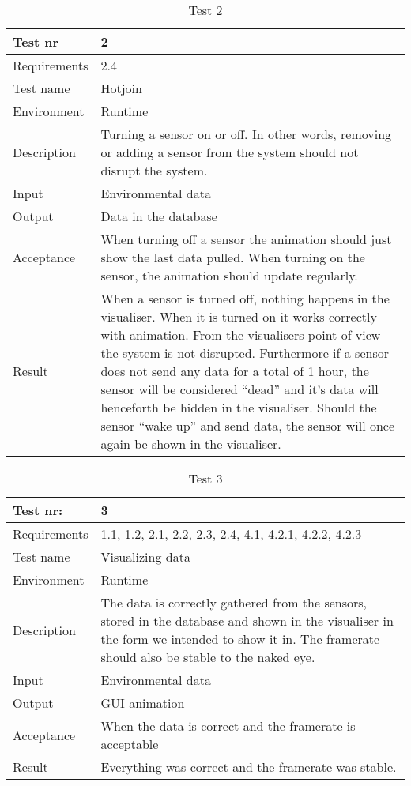 \documentclass[../document]{subfiles}
\begin{document}
\begin{table}[H]
\caption{Test 2}
\centering
\begin{tabularx}{\textwidth}{|l|X|}
	\hline
	Test nr
	&2
	\\ \hline Requirements
	&2.4
	\\ \hline Test name
	&Hotjoin
	\\ \hline Environment
	&Runtime
	\\ \hline Description
	&Turning a sensor on or off. In other words, removing or adding a sensor from the system should not disrupt the system.
	\\ \hline Input
	&Environmental data
	\\ \hline Output
	&Data in the database
	\\ \hline Acceptance
	&When turning off a sensor the animation should just show the last data pulled. When turning on the sensor, the animation should update regularly.
	\\ \hline Result
	&When a sensor is turned off, nothing happens in the visualiser. When it is turned on it works correctly with animation. From the visualisers point of view the system is not disrupted. Furthermore if a sensor does not send any data for a total of 1 hour, the sensor will be considered “dead” and it’s data will henceforth be hidden in the visualiser. Should the sensor “wake up” and send data, the sensor will once again be shown in the visualiser.
	\\ \hline 
\end{tabularx}
\end{table}

\begin{table}[H]
\caption{Test 3}
\centering
\begin{tabularx}{\textwidth}{|l|X|}
	\hline
	Test nr:
	&3
	\\ \hline Requirements
	&1.1, 1.2, 2.1, 2.2, 2.3, 2.4, 4.1, 4.2.1, 4.2.2, 4.2.3
	\\ \hline Test name
	&Visualizing data
	\\ \hline Environment
	&Runtime
	\\ \hline Description
	&The data is correctly gathered from the sensors, stored in the database and shown in the visualiser in the form we intended to show it in. The framerate should also be stable to the naked eye.
	\\ \hline Input
	&Environmental data
	\\ \hline Output
	&GUI animation
	\\ \hline Acceptance
	&When the data is correct and the framerate is acceptable
	\\ \hline Result
	&Everything was correct and the framerate was stable.
	\\ \hline 
\end{tabularx}
\end{table}
\end{document}
